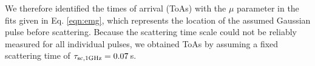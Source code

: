 \documentclass[preprint2,linenumbers]{aastex631}
\begin{document}
\begin{figure}[th]
                  \label{fig:stacked_spectra}
\end{figure}

We therefore identified the times of arrival (ToAs) with the $\mu$ parameter in the fits given in Eq. \eqref{eqn:emg}, which represents the location of the assumed Gaussian pulse before scattering.
Because the scattering time scale could not be reliably measured for all individual pulses, we obtained ToAs by assuming a fixed scattering time of $\tau_{\rm sc,1 GHz} = 0.07\,$s.

\end{document}
